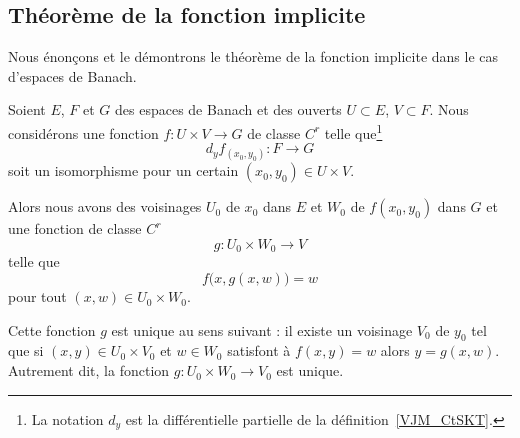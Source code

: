 \subsection{Théorème de la fonction implicite}

Nous énonçons et le démontrons le théorème de la fonction implicite dans le cas d'espaces de Banach.
\begin{theorem} \label{ThoAcaWho}
    Soient \( E\), \( F\) et \( G\) des espaces de Banach et des ouverts \( U\subset E\), \( V\subset F\). Nous considérons une fonction \( f\colon U\times V\to G\) de classe \( C^r\) telle que\footnote{La notation \( d_y\) est la différentielle partielle de la définition~\ref{VJM_CtSKT}.}
    \begin{equation}
        d_yf_{(x_0,y_0)}\colon F\to G
    \end{equation}
    soit un isomorphisme pour un certain \( (x_0,y_0)\in U\times V\).

    Alors nous avons des voisinages \( U_0\) de \( x_0\) dans \( E\) et \( W_0\) de \( f(x_0,y_0)\) dans \( G\) et une fonction de classe \( C^r\)
    \begin{equation}
        g\colon U_0\times W_0\to V
    \end{equation}
    telle que
    \begin{equation}
        f\big( x,g(x,w) \big)=w
    \end{equation}
    pour tout \( (x,w)\in U_0\times W_0\).

    Cette fonction \( g\) est unique au sens suivant : il existe un voisinage \( V_0 \) de \( y_0\) tel que si \( (x,y)\in U_0\times V_0\) et \( w\in W_0\) satisfont à \( f(x,y)=w\) alors \( y=g(x,w)\). Autrement dit, la fonction \( g\colon U_0\times W_0\to V_0\) est unique.
\end{theorem}

